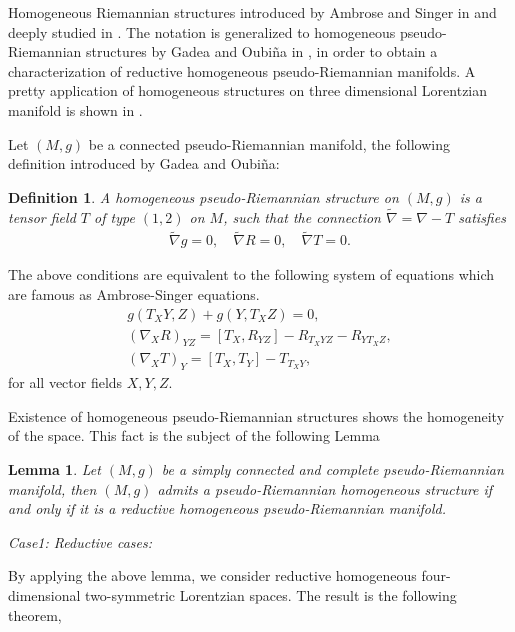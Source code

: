 \documentclass[11pt,oneside,leqno]{amsart}
\theoremstyle{plain}
\newtheorem{definition}[theorem]{Definition}
\newtheorem{lemma}[theorem]{Lemma}
\begin{document}
Homogeneous Riemannian structures introduced by Ambrose and Singer in \cite{WA} and deeply studied in \cite{FT}. The notation is  generalized to homogeneous pseudo-Riemannian structures by Gadea and Oubi\~na in \cite{PG}, in order to obtain a characterization of reductive homogeneous pseudo-Riemannian manifolds. A pretty application of homogeneous structures on three dimensional Lorentzian manifold is shown  in  \cite{GC}.

Let $(M, g)$ be a connected pseudo-Riemannian manifold, the following definition introduced by Gadea and Oubi\~na:
\begin{definition}\cite{PG}
A homogeneous pseudo-Riemannian structure on $(M, g)$ is a tensor field $T$ of type $(1, 2)$ on $M$,
such that the connection $\widetilde{\nabla}=\nabla -T$ satisfies
\begin{equation}\label{HS}
\begin{array}{ccc}
\widetilde{\nabla}g=0,\quad  \widetilde{\nabla}R=0,\quad  \widetilde{\nabla}T=0.
\end{array}
\end{equation}
\end{definition}

The above conditions are equivalent to the following system of equations which are famous as
Ambrose-Singer equations.
\begin{eqnarray}
g(T_XY,Z)+g(Y,T_XZ)=0,\label{AS1}\\
(\nabla_XR)_{YZ}=[T_X,R_{YZ}]-R_{{T_XY}Z}-R_{Y{T_XZ}},\label{AS2}\\
(\nabla_XT)_Y=[T_X,T_Y]-T_{T_XY}\label{AS3},
\end{eqnarray}
for all vector fields $X,Y,Z$.

Existence of homogeneous pseudo-Riemannian structures shows the homogeneity of the space. This fact is the subject of the following Lemma
\begin{lemma}\label{GOThm}\cite{PG}
Let $(M,g)$ be a simply connected and complete pseudo-Riemannian manifold, then
$(M,g)$ admits a pseudo-Riemannian homogeneous structure if and only if it is a reductive homogeneous pseudo-Riemannian manifold.
\end{lemma}

{\em Case1: Reductive cases:}

By applying the above lemma, we consider reductive homogeneous four-dimensional two-symmetric Lorentzian spaces. The result is the following theorem,
\end{document}
